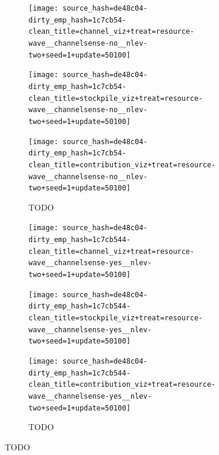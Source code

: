 \begin{figure}[!htbp]
\begin{center}
\begin{subfigure}[b]{\textwidth}
  \begin{minipage}{0.2\textwidth}
  \texttt{[image: source\_hash=de48c04-dirty\_emp\_hash=1c7cb54-clean\_title=channel\_viz+treat=resource-wave\_\_channelsense-no\_\_nlev-two+seed=1+update=50100]}
  \end{minipage}
  \begin{minipage}{0.2\textwidth}
  \texttt{[image: source\_hash=de48c04-dirty\_emp\_hash=1c7cb54-clean\_title=stockpile\_viz+treat=resource-wave\_\_channelsense-no\_\_nlev-two+seed=1+update=50100]}
  \end{minipage}
  \begin{minipage}{0.2\textwidth}
  \texttt{[image: source\_hash=de48c04-dirty\_emp\_hash=1c7cb54-clean\_title=contribution\_viz+treat=resource-wave\_\_channelsense-no\_\_nlev-two+seed=1+update=50100]}
  \end{minipage}
  \begin{minipage}{0.2\textwidth}
  \caption{TODO}
  \label{fig:TODO}
  \end{minipage}
\end{subfigure}

\begin{subfigure}[b]{\textwidth}
  \begin{minipage}{0.2\textwidth}
  \texttt{[image: source\_hash=de48c04-dirty\_emp\_hash=1c7cb544-clean\_title=channel\_viz+treat=resource-wave\_\_channelsense-yes\_\_nlev-two+seed=1+update=50100]}
  \end{minipage}
  \begin{minipage}{0.2\textwidth}
  \texttt{[image: source\_hash=de48c04-dirty\_emp\_hash=1c7cb544-clean\_title=stockpile\_viz+treat=resource-wave\_\_channelsense-yes\_\_nlev-two+seed=1+update=50100]}
  \end{minipage}
  \begin{minipage}{0.2\textwidth}
  \texttt{[image: source\_hash=de48c04-dirty\_emp\_hash=1c7cb544-clean\_title=contribution\_viz+treat=resource-wave\_\_channelsense-yes\_\_nlev-two+seed=1+update=50100]}
  \end{minipage}
  \begin{minipage}{0.2\textwidth}
  \caption{TODO}
  \label{fig:TODO}
  \end{minipage}
\end{subfigure}


\end{center}
\end{figure}
